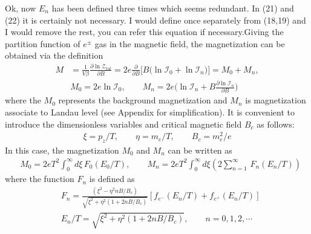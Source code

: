 \documentclass[sn-mathphys,Numbered]{sn-jnl}
\newcommand{\rev}[1]{{\color{blue}#1}}
\begin{document}
\rev{Ok, now $E_n$ has been defined three times which seems redundant. In (21) and (22) it is certainly not necessary. I would define once separately from (18,19) and I would remove the rest, you can refer this equation if necessary.}Giving the partition function of $e^\pm$ gas in the magnetic field, the magnetization can be obtained via the definition
\begin{align}
M&=\frac{1}{V\beta}\frac{\partial \ln \mathcal{Z}_{tot}}{\partial B}=2e\frac{\partial}{\partial B}\bigg[B\bigg(\ln\mathcal{I}_{0}+\ln\mathcal{I}_{n}\bigg)\bigg]=M_0+M_n,\\
&M_0=2e\ln\mathcal{I}_{0},\qquad
\label{M_landau}
M_n=2e\bigg(\ln\mathcal{I}_{n}+B\frac{\partial\ln\mathcal{I}_n}{\partial B}\bigg)
\end{align}
where the $M_0$ represents the background magnetization  and $M_n$ is magnetization associate to Landau level (see Appendix for simplification). It is convenient to introduce the dimensionless variables and critical magnetic field $B_c$ as follows:
\begin{align}
\xi=p_z/T,\qquad \eta=m_e/T,\qquad B_c=m^2_e/e
\end{align}
In this case, the magnetization $M_0$ and $M_n$ can be written as
\begin{align}
&M_0=2eT^2\int_0^\infty\!\!d\xi\, F_0(E_0/T),\qquad M_n=2eT^2\int_{0}^\infty\!\!d\xi\left(2\sum_{n=1}^\infty\,F_n(E_n/T)\right)
\end{align}
where the function $F_n$ is defined as
\begin{align}
&F_n=\frac{(\xi^2-\eta^2nB/B_c)}{\sqrt{\xi^2+\eta^2\left(1+2nB/B_c\right)}}\left[f_{e^-}(E_n/T)+f_{e^+}(E_n/T)\right]\\
&E_n/T=\sqrt{\xi^2+\eta^2\left(1+2nB/B_c\right)},\qquad n=0,1,2,\cdots
\end{align}
\end{document}
